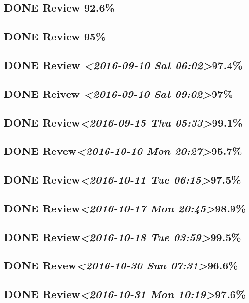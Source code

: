 \documentclass[11pt]{ctexart}
\begin{document}
\subsection{{\bfseries\sffamily DONE} Review 92.6\%}
\label{sec:org6fdb58d}
\subsection{{\bfseries\sffamily DONE} Review 95\%}
\label{sec:orgcebd7da}
\subsection{{\bfseries\sffamily DONE} Review \textit{<2016-09-10 Sat 06:02>}97.4\%}
\label{sec:org3eb563e}
\subsection{{\bfseries\sffamily DONE} Reivew \textit{<2016-09-10 Sat 09:02>}97\%}
\label{sec:org7af7db5}
\subsection{{\bfseries\sffamily DONE} Review\textit{<2016-09-15 Thu 05:33>}99.1\%}
\label{sec:orge3d5c31}
\subsection{{\bfseries\sffamily DONE} Revew\textit{<2016-10-10 Mon 20:27>}95.7\%}
\label{sec:org57df0ed}
\subsection{{\bfseries\sffamily DONE} Review\textit{<2016-10-11 Tue 06:15>}97.5\%}
\label{sec:org22e1486}
\subsection{{\bfseries\sffamily DONE} Review\textit{<2016-10-17 Mon 20:45>}98.9\%}
\label{sec:orgc07d684}
\subsection{{\bfseries\sffamily DONE} Review\textit{<2016-10-18 Tue 03:59>}99.5\%}
\label{sec:org12cd815}
\subsection{{\bfseries\sffamily DONE} Revew\textit{<2016-10-30 Sun 07:31>}96.6\%}
\label{sec:org1bc83e6}
\subsection{{\bfseries\sffamily DONE} Review\textit{<2016-10-31 Mon 10:19>}97.6\%}
\label{sec:org28622ac}
\end{document}
